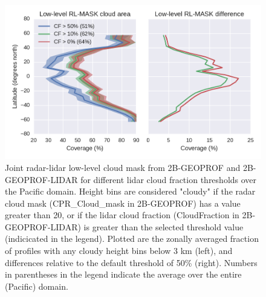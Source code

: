 \begin{figure}
\centering
\includegraphics[width=\columnwidth]{graphics/misr_rlmask_test.pdf}
\caption{Joint radar-lidar low-level cloud mask from 2B-GEOPROF and 2B-GEOPROF-LIDAR for different lidar cloud fraction thresholds over the Pacific domain. Height bins are considered "cloudy" if the radar cloud mask (CPR\_Cloud\_mask in 2B-GEOPROF) has a value greater than 20, or if the lidar cloud fraction (CloudFraction in 2B-GEOPROF-LIDAR) is greater than the selected threshold value (indicicated in the legend). Plotted are the zonally averaged fraction of profiles with any cloudy height bins below 3 km (left), and differences relative to the default threshold of 50\% (right). Numbers in parentheses in the legend indicate the average over the entire (Pacific) domain.}
\label{misr_rlmask_test}
\end{figure}

